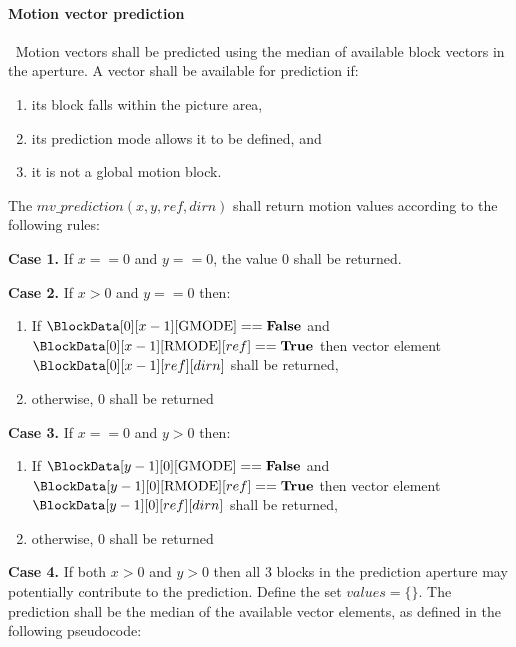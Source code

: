 \paragraph{Motion vector prediction}
\label{mvprediction}
$\ $\newline
Motion vectors shall be predicted using the median of available block vectors 
in the aperture. A vector shall be available for prediction if:
\begin{enumerate}
\item its block falls within the picture area,
\item its prediction mode allows it to be defined, and
\item it is not a global motion block. 
\end{enumerate}

The $mv\_prediction(x, y, ref, dirn)$ shall return motion values according to
the following rules:

{\bf Case 1.}  If $x==0$ and $y==0$, the value $0$ shall be returned.

{\bf Case 2.} If $x>0$ and $y==0$ then:
\begin{enumerate}
   \item If  $\BlockData[0][x-1][\GMode]==\false$  and 
$\BlockData[0][x-1][\RMode][ref]==\true$ then vector element $\BlockData[0][x-1][ref][dirn]$ shall be returned,
   \item otherwise, $0$ shall be returned
\end{enumerate}

{\bf Case 3.} If $x==0$ and $y>0$ then:
\begin{enumerate}
   \item If  $\BlockData[y-1][0][\GMode]==\false$ and 
$\BlockData[y-1][0][\RMode][ref]==\true$ then vector element 
$\BlockData[y-1][0][ref][dirn]$ shall be returned,
   \item otherwise, $0$ shall be returned
\end{enumerate}

{\bf Case 4.} If both $x>0$ and $y>0$ then all 3 blocks in the prediction aperture 
may potentially contribute to the prediction. Define the set $values=\{\}$. The prediction 
shall be the median of the available vector elements, as defined in the following
pseudocode:

\begin{pseudo*}
    \bsIF{\BlockData[y][x-1][\GMode]==\false}
        \bsIF{\BlockData[y][x-1][\RMode][ref]==\true}
        \bsEND
    \bsEND
    \bsIF{\BlockData[y-1][x][\GMode]==\false}
        \bsIF{\BlockData[y-1][x][\RMode][ref]==\true}
        \bsEND
    \bsEND
    \bsIF{\BlockData[y-1][x-1][\GMode]==\false}
        \bsIF{\BlockData[y-1][x-1][\RMode][ref]==\true}
        \bsEND
    \bsEND

\bsEND
\end{pseudo*}

